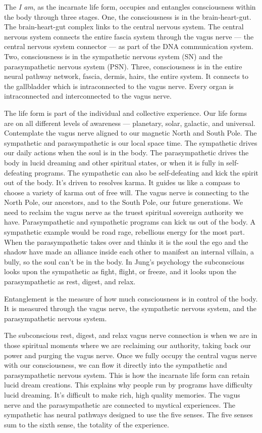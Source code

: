 \documentclass[letterpaper,9pt,twoside,titlepage,onecolumn,openany]{book}
\begin{document}
The \emph{I am}, as the incarnate life form, occupies and entangles
consciousness within the body through three stages. One, the
consciousness is in the brain-heart-gut. The brain-heart-gut complex
links to the central nervous system. The central nervous system connects
the entire fascia system through the vagus nerve --- the central nervous
system connector --- as part of the DNA communication system. Two,
consciousness is in the sympathetic nervous system (SN) and the
parasympathetic nervous system (PSN). Three, consciousness is in the
entire neural pathway network, fascia, dermis, hairs, the entire system.
It connects to the gallbladder which is intraconnected to the vagus
nerve. Every organ is intraconnected and interconnected to the vagus
nerve.

The life form is part of the individual and collective experience. Our
life forms are on all different levels of awareness --- planetary,
solar, galactic, and universal. Contemplate the vagus nerve aligned to
our magnetic North and South Pole. The sympathetic and parasympathetic
is our local space time. The sympathetic drives our daily actions when
the soul is in the body. The parasympathetic drives the body in lucid
dreaming and other spiritual states, or when it is fully in
self-defeating programs. The sympathetic can also be self-defeating and
kick the spirit out of the body. It's driven to resolves karma. It
guides us like a compass to choose a variety of karma out of free will.
The vagus nerve is connecting to the North Pole, our ancestors, and to
the South Pole, our future generations. We need to reclaim the vagus
nerve as the truest spiritual sovereign authority we have.
Parasympathetic and sympathetic programs can kick us out of the body. A
sympathetic example would be road rage, rebellious energy for the most
part. When the parasympathetic takes over and thinks it is the soul the
ego and the shadow have made an alliance inside each other to manifest
an internal villain, a bully, so the soul can't be in the body. In
Jung's psychology the subconscious looks upon the sympathetic as fight,
flight, or freeze, and it looks upon the parasympathetic as rest,
digest, and relax.

Entanglement is the measure of how much consciousness is in control of
the body. It is measured through the vagus nerve, the sympathetic
nervous system, and the parasympathetic nervous system.

The subconscious rest, digest, and relax vagus nerve connection is when
we are in those spiritual moments where we are reclaiming our authority,
taking back our power and purging the vagus nerve. Once we fully occupy
the central vagus nerve with our consciousness, we can flow it directly
into the sympathetic and parasympathetic nervous system. This is how the
incarnate life form can retain lucid dream creations. This explains why
people run by programs have difficulty lucid dreaming. It's difficult to
make rich, high quality memories. The vagus nerve and the
parasympathetic are connected to mystical experiences. The sympathetic
has neural pathways designed to use the five senses. The five senses sum
to the sixth sense, the totality of the experience.
\end{document}
